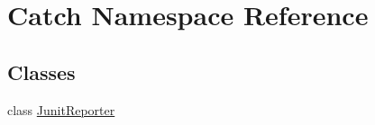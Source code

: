 \hypertarget{namespace_catch}{}\section{Catch Namespace Reference}
\label{namespace_catch}
\subsection*{Classes}
\begin{DoxyCompactItemize}
\item 
class \hyperlink{class_catch_1_1_junit_reporter}{Junit\+Reporter}
\end{DoxyCompactItemize}
